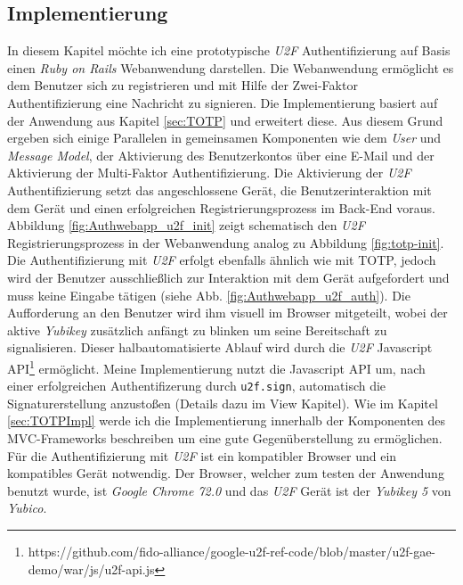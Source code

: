 \documentclass[11pt,a4paper,ngerman]{scrreprt}
\begin{document}
\subsection{Implementierung}\label{sec:u2fImpl}
In diesem Kapitel möchte ich eine prototypische \textit{U2F} Authentifizierung auf Basis einen \textit{Ruby on Rails} Webanwendung darstellen. Die Webanwendung ermöglicht es dem Benutzer sich zu registrieren und mit Hilfe der Zwei-Faktor Authentifizierung eine Nachricht zu signieren. Die Implementierung basiert auf der Anwendung aus Kapitel \ref{sec:TOTP} und erweitert diese. Aus diesem Grund ergeben sich einige Parallelen in gemeinsamen Komponenten wie dem \textit{User} und \textit{Message Model}, der Aktivierung des Benutzerkontos über eine E-Mail und der Aktivierung der Multi-Faktor Authentifizierung. Die Aktivierung der \textit{U2F} Authentifizierung setzt das angeschlossene Gerät, die Benutzerinteraktion mit dem Gerät und einen erfolgreichen Registrierungsprozess im Back-End voraus. Abbildung \ref{fig:Authwebapp_u2f_init} zeigt schematisch den \textit{U2F} Registrierungsprozess in der Webanwendung analog zu Abbildung \ref{fig:totp-init}. Die Authentifizierung mit \textit{U2F} erfolgt ebenfalls ähnlich wie mit TOTP, jedoch wird der Benutzer ausschließlich zur Interaktion mit dem Gerät aufgefordert und muss keine Eingabe tätigen (siehe Abb. \ref{fig:Authwebapp_u2f_auth}). Die Aufforderung an den Benutzer wird ihm visuell im Browser mitgeteilt, wobei der aktive \textit{Yubikey} zusätzlich anfängt zu blinken um seine Bereitschaft zu signalisieren. Dieser halbautomatisierte Ablauf wird durch die \textit{U2F} Javascript API\footnote{https://github.com/fido-alliance/google-u2f-ref-code/blob/master/u2f-gae-demo/war/js/u2f-api.js} ermöglicht. Meine Implementierung nutzt die Javascript API um, nach einer erfolgreichen Authentifizerung durch \texttt{u2f.sign}, automatisch die Signaturerstellung anzustoßen (Details dazu im View Kapitel). Wie im Kapitel \ref{sec:TOTPImpl} werde ich die Implementierung innerhalb der Komponenten des MVC-Frameworks beschreiben um eine gute Gegenüberstellung zu ermöglichen. Für die Authentifizierung mit \textit{U2F} ist ein kompatibler Browser und ein kompatibles Gerät notwendig. Der Browser, welcher zum testen der Anwendung benutzt wurde, ist \textit{Google Chrome 72.0} und das \textit{U2F} Gerät ist der \textit{Yubikey 5} von \textit{Yubico}.
\end{document}
